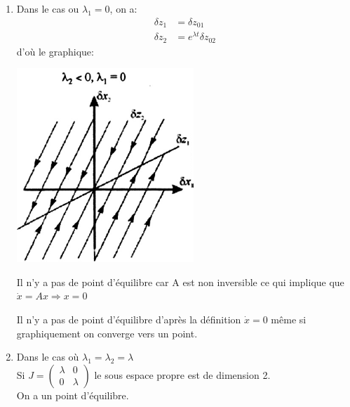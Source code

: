 \documentclass[main.tex]{subfiles}
\begin{document}
\begin{enumerate}
\item Dans le cas ou $\lambda_1 = 0$, on a:
\begin{align*}
\delta z_1 &= \delta z_{01}\\
\delta z_2 &= e^{\lambda t} \delta z_{02}
\end{align*}
d'où le graphique:
\begin{center}
\includegraphics[scale=0.5]{1/graph6.png}
\end{center}
Il n'y a pas de point d'équilibre car A est non inversible ce qui implique que $\dot{x}=Ax \Rightarrow x=0$\\

\begin{rem}
Il n'y a pas de point d'équilibre d'après la définition $ \dot{x} = 0$ même si graphiquement on converge vers un point.
\end{rem}

\item Dans le cas où $\lambda_1 = \lambda_2 = \lambda$\\
Si $J = \begin{pmatrix}\lambda & 0 \\ 0 & \lambda\end{pmatrix}$ le sous espace propre est de dimension 2.\\
On a un point d'équilibre.



\end{enumerate}
\end{document}
